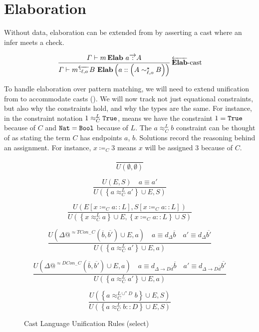 \section{Elaboration}
Without data, elaboration can be extended from  by asserting a cast where an infer meets a check.

\[
\frac{\varGamma\vdash m\,\textbf{Elab}\ a\overrightarrow{\,:\,}A}{\varGamma\vdash m\overleftarrow{\,:_{\ell,o}\,}B\ \textbf{Elab}\left(a::\left(A\sim_{\ell,o}^{\star}B\right)\right)}
\rulename{\overleftarrow{\textbf{Elab}}-cast}
\]


To handle elaboration over pattern matching, we will need to extend unification from  to accommodate casts ().
We will now track not just equational constraints, but also why the constraints hold, and why the types are the same.
For instance, in the constraint notation $1 \approx_{C}^{L} \mathtt{True}{}$, means we have the constraint $1 = \mathtt{True}{}$ because of $C$ and $\mathtt{Nat}{} = \mathtt{Bool}{}$ because of $L$.
The $a \approx_{C}^{L} b$ constraint can be thought of as stating the term $C$ has endpoints $a$, $b$.
Solutions record the reasoning behind an assignment.
For instance, $x\coloneqq_{C} 3$ means $x$ will be assigned $3$ because of $C$.

\begin{figure}
\[
\frac{\,}{U\left(\emptyset,\emptyset\right)}
\]

\[
\frac{
  U\left(E,S\right)\quad a\equiv a'
}{
  U\left(\left\{ a \approx_{C}^{L} a' \right\} \cup E,S\right)
}
\]

\[
\frac{
  U\left(E\left[x\coloneqq_{C} a :: L\right],S\left[x\coloneqq_{C} a :: L\right]\right)
}{
  U\left(\left\{ x \approx_{C}^{L} a\right\} \cup E,\left\{x\coloneqq_{C} a :: L\right\} \cup S \right) 
}
\]

\[
\frac{
  U\left(\Delta @^{\approx TCon_{-}C}( \overline{b},\overline{b'} ) \cup E,a\right)\quad
  a\equiv d_{\Delta}\overline{b}
  \quad   a' \equiv d_{\Delta}\overline{b'}
}{U\left(\left\{ a \approx_{C}^{L} a'\right\} \cup E,a\right)}
\]

\[
\frac{
  U\left(\Delta @^{\approx DCon_{-}C}( \overline{b},\overline{b'} ) \cup E,a\right)\quad
  a\equiv d_{\Delta\rightarrow D\overline{d}}\overline{b}
  \quad   a' \equiv d_{\Delta\rightarrow D\overline{d}}\overline{b'}
}{U\left(\left\{ a \approx_{C}^{L} a'\right\} \cup E,a\right)}
\]

\[
\frac{
  U\left( \left\{ a \approx_{C}^{L\cup^{\star}D} b \right\}\cup E, S \right)
}{
  U\left(\left\{ a \approx_{C}^{L} b::D \right\} \cup E, S \right) 
}
\]

\caption{Cast Language Unification Rules (select)}
\label{fig:cast-data-unification}
\end{figure}

